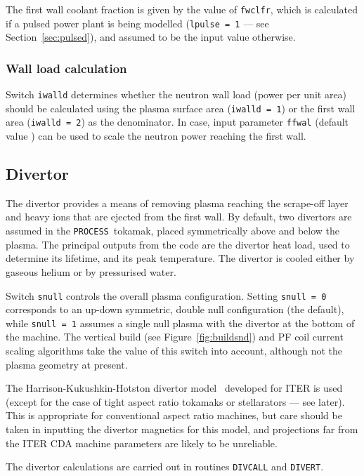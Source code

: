 \documentclass[11pt,a4paper]{report}
\newcommand{\process}{\mbox{\texttt{PROCESS}}}
\begin{document}
The first wall coolant fraction is given by the value of \texttt{fwclfr},
which is calculated if a pulsed power plant is being modelled (\texttt{lpulse
  = 1} --- see Section~\ref{sec:pulsed}), and assumed to be the input value
otherwise.

\subsubsection*{Wall load calculation}

Switch \texttt{iwalld} determines whether the neutron wall load (power per
unit area) should be calculated using the plasma surface area (\texttt{iwalld
  = 1}) or the first wall area (\texttt{iwalld = 2}) as the denominator. In
 case, input parameter \texttt{ffwal} (default value )
can be used to scale the neutron power reaching the first wall.

\subsection{Divertor}
\label{sec:divertor}

The divertor provides a means of removing plasma reaching the scrape-off layer
and heavy ions that are ejected from the first wall.  By default, two
divertors are assumed in the \process\ tokamak, placed symmetrically above
and below the plasma. The principal outputs from the code are the divertor
heat load, used to determine its lifetime, and its peak temperature. The
divertor is cooled either by gaseous helium or by pressurised water.

Switch \texttt{snull} controls the overall plasma configuration. Setting
\texttt{snull = 0} corresponds to an up-down symmetric, double null
configuration (the default), while \texttt{snull = 1} assumes a single null
plasma with the divertor at the bottom of the machine. The vertical build (see
Figure~\ref{fig:buildsnd}) and PF coil current scaling algorithms take the
value of this switch into account, although not the plasma geometry at
present.

The Harrison-Kukushkin-Hotston divertor model~\cite{IPDG} developed for ITER
is used (except for the case of tight aspect ratio tokamaks or stellarators
--- see later). This is appropriate for conventional aspect ratio machines,
but care should be taken in inputting the divertor magnetics for this model,
and projections far from the ITER CDA machine parameters are likely to be
unreliable.

The divertor calculations are carried out in routines \texttt{DIVCALL} and
\texttt{DIVERT}.
\end{document}
